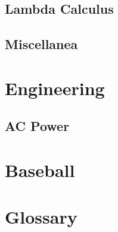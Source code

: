 \documentclass[10pt,letterpaper]{scrartcl}
\begin{document}
\subsection{Lambda Calculus}
\subsection[Misc.]{Miscellanea}

\newpage\section{Engineering}
\subsection{AC Power}

\newpage\section{Baseball}

\newpage\section{Glossary}
\end{document}

